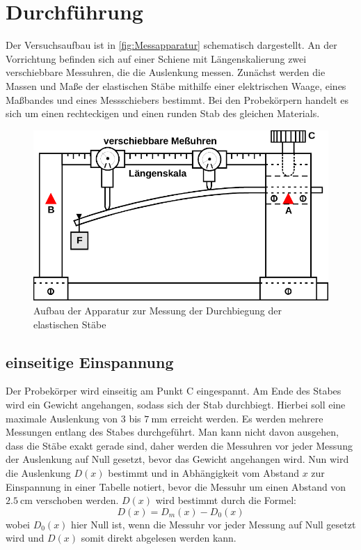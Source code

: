 \section{Durchführung}
\label{sec:Durchführung}

Der Versuchsaufbau ist in \autoref{fig:Messapparatur} schematisch dargestellt.
An der Vorrichtung befinden sich auf einer Schiene mit Längenskalierung zwei verschiebbare Messuhren, die die Auslenkung messen.
Zunächst werden die Massen und Maße der elastischen Stäbe mithilfe einer elektrischen Waage, eines Maßbandes und eines Messschiebers bestimmt.
Bei den Probekörpern handelt es sich um einen rechteckigen und einen runden Stab des gleichen Materials. 


\begin{figure}[H]
    \centering
    \includegraphics{content/Messapparat.pdf}
    \caption{Aufbau der Apparatur zur Messung der Durchbiegung der elastischen Stäbe\cite[111]{V103}}
    \label{fig:Messapparatur}
\end{figure}

\subsection{einseitige Einspannung}
Der Probekörper wird einseitig am Punkt C eingespannt. 
Am Ende des Stabes wird ein Gewicht angehangen, sodass sich der Stab durchbiegt. 
Hierbei soll eine maximale Auslenkung von $\num{3}$ bis $\qty{7}{\milli\meter}$ erreicht werden.
Es werden mehrere Messungen entlang des Stabes durchgeführt.
Man kann nicht davon ausgehen, dass die Stäbe exakt gerade sind, daher werden die Messuhren vor jeder Messung der Auslenkung auf Null gesetzt,
bevor das Gewicht angehangen wird.
Nun wird die Auslenkung $D(x)$ bestimmt und in Abhängigkeit vom Abstand $x$ zur Einspannung in einer Tabelle notiert, 
bevor die Messuhr um einen Abstand von $\qty{2,5}{\centi\meter}$ verschoben werden.
$D(x)$ wird bestimmt durch die Formel:
\begin{equation}
    D(x) = D_m(x) - D_0(x)
    \label{eqn:D(x)1}
\end{equation}
wobei $D_0(x)$ hier Null ist, wenn die Messuhr vor jeder Messung auf Null gesetzt wird und $D(x)$ somit direkt abgelesen werden kann.

